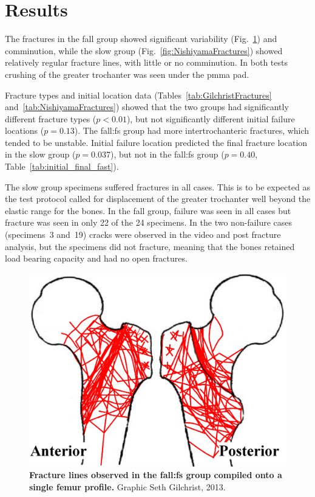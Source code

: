 \section{Results}
The fractures in the fall group showed significant variability (Fig.~\ref{fig:GilchristFractures}) and comminution, while the slow group (Fig.~\ref{fig:NishiyamaFractures}) showed relatively regular fracture lines, with little or no comminution.
In both tests crushing of the greater trochanter was seen under the \ac{pmma} pad.

Fracture types and initial location data (Tables~\ref{tab:GilchristFractures} and~\ref{tab:NishiyamaFractures}) showed that the two groups had significantly different fracture types ($p < 0.01$), but not significantly different initial failure locations ($p = 0.13$).
The fall:\ac{fs} group had more intertrochanteric fractures, which tended to be unstable.
Initial failure location predicted the final fracture location in the slow group ($p = 0.037$), but not in the fall:\ac{fs} group ($p=0.40$, Table~\ref{tab:initial_final_fast}).

The slow group specimens suffered fractures in all cases.
This is to be expected as the test protocol called for displacement of the greater trochanter well beyond the elastic range for the bones.
In the fall group, failure was seen in all cases but fracture was seen in only 22 of the 24 specimens.
In the two non-failure cases (specimens~3 and~19) cracks were observed in the video and post fracture analysis, but the specimens did not fracture, meaning that the bones retained load bearing capacity and had no open fractures.

\begin{figure}
	\centering
	\includegraphics[width=0.7\linewidth]{./fracture/Figures/GilchristFractures.eps}
	\caption[Fall:\acs*{fs} group fracture lines]{\textbf{Fracture lines observed in the fall:\ac{fs} group compiled onto a single femur profile.} Graphic \textcopyright Seth Gilchrist, 2013.}
	\label{fig:GilchristFractures}
\end{figure}

